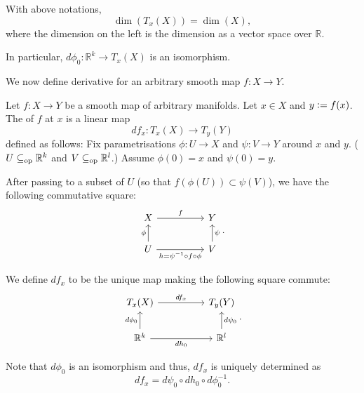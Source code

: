 \begin{thm}
	With above notations,
	\begin{equation*} 
		\boxed{\dim(T_{x}(X)) = \dim(X),}
	\end{equation*}
	where the dimension on the left is the dimension as a vector space over $\mathbb{R}$.

	In particular, $d\phi_{0} : \mathbb{R}^{k} \to T_{x}(X)$ is an isomorphism.
\end{thm}

We now define derivative for an arbitrary smooth map $f : X \to Y$.

\begin{defn}
	Let $f : X \to Y$ be a smooth map of arbitrary manifolds. Let $x \in X$ and $y \vcentcolon= f(x)$. The  of $f$ at $x$ is a linear map
	\begin{equation*} 
		df_{x} : T_{x}(X) \to T_{y}(Y)
	\end{equation*}
	defined as follows: Fix parametrisations $\phi : U \to X$ and $\psi : V \to Y$ around $x$ and $y$. ($U \subseteq_{\operatorname{op}} \mathbb{R}^{k}$ and $V \subseteq_{\operatorname{op}} \mathbb{R}^{l}$.) Assume $\phi(0) = x$ and $\psi(0) = y$.

	After passing to a subset of $U$ (so that $f(\phi(U)) \subset \psi(V)$), we have the following commutative square:
	\begin{equation*} 
		\begin{tikzcd}
			X \arrow[rr, "f"] & & Y \\
			U \arrow[u, "\phi"] \arrow[rr, "h = \psi^{-1} \circ f \circ \phi"'] & & V \arrow[u, "\psi"']
		\end{tikzcd}.
	\end{equation*}

	We define $df_{x}$ to be the unique map making the following square commute:
	\begin{equation*} 
		\begin{tikzcd}
			T_{x}(X) \arrow[rr, "df_{x}"] & & T_{y}(Y) \\
			\mathbb{R}^{k} \arrow[u, "d\phi_{0}"] \arrow[rr, "dh_{0}"'] & & \mathbb{R}^{l} \arrow[u, "d\psi_{0}"']
		\end{tikzcd}.
	\end{equation*}
\end{defn}
Note that $d\phi_{0}$ is an isomorphism and thus, $df_{x}$ is uniquely determined as
\begin{equation*} 
	df_{x} = d\psi_{0} \circ dh_{0} \circ d\phi_{0}^{-1}.
\end{equation*}

